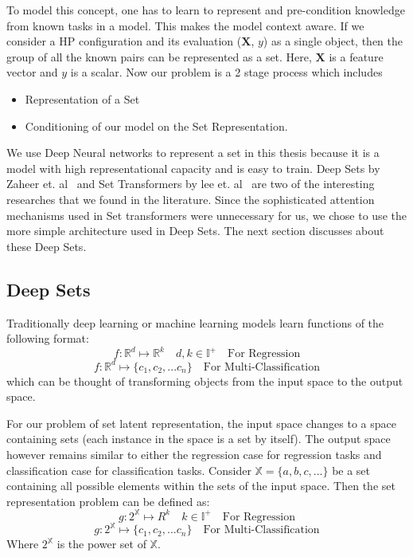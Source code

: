 \documentclass[12pt, twoside, ngerman]{report}
\begin{document}
To model this concept,  one has to learn to represent and pre-condition knowledge from known tasks in a model.
This makes the model context aware.
If we consider a HP configuration and its evaluation ($\textbf{X}$, $y$) as a single object,  then the group of all the known pairs can be represented as a set.
Here,  $\textbf{X}$ is a feature vector and $y$ is a scalar.
Now our problem is a 2 stage process which includes
\begin{itemize}
\item Representation of a Set
\item Conditioning of our model on the Set Representation.
\end{itemize}


We use Deep Neural networks to represent a set in this thesis because it is a model with  high representational capacity and is easy to train.
Deep Sets by Zaheer et.  al~\cite{deepSets} and Set Transformers by lee et. al~\cite{setTransformer} are two of the interesting researches that we found in the literature.
Since the sophisticated attention mechanisms used in Set transformers were unnecessary for us,  we chose to use the more simple architecture used in Deep Sets.
The next section discusses about these Deep Sets.

\subsection{Deep Sets}\label{sec:DeepSets}
Traditionally deep learning or machine learning models learn functions of the following format:
$$
f : \mathbb{R}^d \mapsto \mathbb{R}^k \quad d,k \in \mathbb{I}^+ \quad \textrm{For Regression}
$$
$$
f : \mathbb{R}^d \mapsto \{c_1, c_2, ... c_n\}  \quad \textrm{For Multi-Classification}
$$
which can be thought of transforming objects from the input space to the output space.

For our problem of set latent representation,  the input space changes to a space containing sets (each instance in the space is a set by itself).
The output space however remains similar to either the regression case for regression tasks and classification case for classification tasks.
Consider $\mathbb{X} = \{a,b,  c, ... \}$ be a set containing all possible elements within the sets of the input space.
Then the set representation problem can be defined as:
$$
g : 2^{\mathbb{X}} \mapsto R^k   \quad k \in \mathbb{I}^+ \quad \textrm{For Regression}
$$
$$
g : 2^{\mathbb{X}} \mapsto \{c_1, c_2, ... c_n\}  \quad \textrm{For Multi-Classification}
$$
Where $2^{\mathbb{X}}$ is the power set of $\mathbb{X}$.
\end{document}
